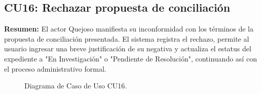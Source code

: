 \begin{appendices}
\newpage

\subsection{CU16: Rechazar propuesta de conciliación}

\textbf{Resumen:} 
El actor Quejoso manifiesta su inconformidad con los términos de la propuesta de conciliación presentada. El sistema registra el rechazo, permite al usuario ingresar una breve justificación de su negativa y actualiza el estatus del expediente a "En Investigación" o "Pendiente de Resolución", continuando así con el proceso administrativo formal.

\begin{figure}[htbp]
    \centering
    \figCUdieciseis
    \caption{Diagrama de Caso de Uso CU16.}
    \label{fig:cu16}
\end{figure}


\end{appendices}
